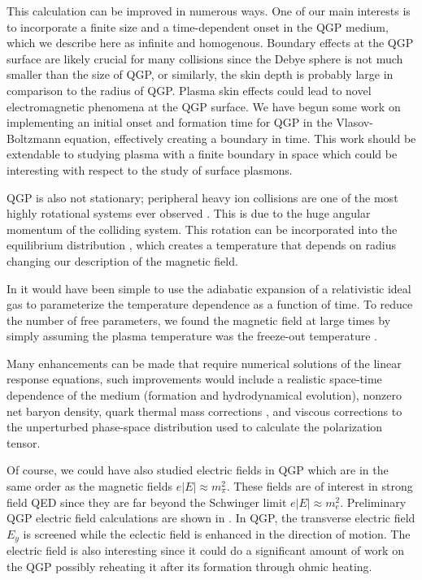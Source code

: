 This calculation can be improved in numerous ways. One of our main interests is to incorporate a finite size and a time-dependent onset in the QGP medium, which we describe here as infinite and homogenous. Boundary effects at the QGP surface are likely crucial for many collisions since the Debye sphere is not much smaller than the size of QGP, or similarly, the skin depth is probably large in comparison to the radius of QGP. Plasma skin effects could lead to novel electromagnetic phenomena at the QGP surface. We have begun some work on implementing an initial onset and formation time for QGP in the Vlasov-Boltzmann equation, effectively creating a boundary in time. This work should be extendable to studying plasma with a finite boundary in space which could be interesting with respect to the study of surface plasmons.

QGP is also not stationary; peripheral heavy ion collisions are one of the most highly rotational systems ever observed \cite{Csernai:2013bq,Deng:2016vhi,Jiang:2016woz,Becattini:2020pvq}. This is due to the huge angular momentum of the colliding system. This rotation can be incorporated into the equilibrium distribution \cite{Hakim:2011bk}, which creates a temperature that depends on radius \cite{Chernikov:1964edr} changing our description of the magnetic field.

In \cite{Grayson:2022asf} it would have been simple to use the adiabatic expansion of a relativistic ideal gas \cite{Bjorken:1982qr} to parameterize the temperature dependence as a function of time. To reduce the number of free parameters, we found the magnetic field at large times by simply assuming the plasma temperature was the freeze-out temperature .

Many enhancements can be made that require numerical solutions of the linear response equations, such improvements would include a realistic space-time dependence of the medium (formation and hydrodynamical evolution), nonzero net baryon density, quark thermal mass corrections \cite{Weldon:1982bn}, and viscous corrections to the unperturbed phase-space distribution used to calculate the polarization tensor.

Of course, we could have also studied electric fields in QGP which are in the same order as the magnetic fields $e|E| \approx m_\pi^2$. These fields are of interest in strong field QED since they are far beyond the Schwinger limit $e|E| \approx m_e^2$. Preliminary QGP electric field calculations are shown in . In QGP, the transverse electric field $E_y$ is screened while the eclectic field is enhanced in the direction of motion. The electric field is also interesting since it could do a significant amount of work on the QGP possibly reheating it after its formation through ohmic heating. 

